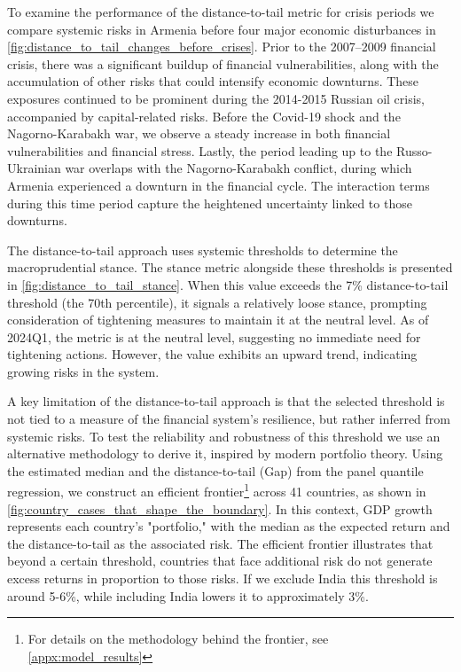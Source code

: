 To examine the performance of the distance-to-tail metric for crisis periods we compare systemic risks in Armenia before four major economic disturbances in \autoref{fig:distance_to_tail_changes_before_crises}. Prior to the 2007–2009 financial crisis, there was a significant buildup of financial vulnerabilities, along with the accumulation of other risks that could intensify economic downturns. These exposures continued to be prominent during the 2014-2015 Russian oil crisis, accompanied by capital-related risks. Before the Covid-19 shock and the Nagorno-Karabakh war, we observe a steady increase in both financial vulnerabilities and financial stress. Lastly, the period leading up to the Russo-Ukrainian war overlaps with the Nagorno-Karabakh conflict, during which Armenia experienced a downturn in the financial cycle. The interaction terms during this time period capture the heightened uncertainty linked to those downturns.

The distance-to-tail approach uses systemic thresholds to determine the macroprudential stance. The stance metric alongside these thresholds is presented in \autoref{fig:distance_to_tail_stance}. When this value exceeds the 7\% distance-to-tail threshold (the 70th percentile), it signals a relatively loose stance, prompting consideration of tightening measures to maintain it at the neutral level. As of 2024Q1, the metric is at the neutral level, suggesting no immediate need for tightening actions. However, the value exhibits an upward trend, indicating growing risks in the system.

A key limitation of the distance-to-tail approach is that the selected threshold is not tied to a measure of the financial system’s resilience, but rather inferred from systemic risks. To test the reliability and robustness of this threshold we use an alternative methodology to derive it, inspired by modern portfolio theory. Using the estimated median and the distance-to-tail (Gap) from the panel quantile regression, we construct an efficient frontier\footnote{For details on the methodology behind the frontier, see \ref{appx:model_results}} across 41 countries, as shown in \autoref{fig:country_cases_that_shape_the_boundary}. In this context, GDP growth represents each country’s "portfolio," with the median as the expected return and the distance-to-tail as the associated risk. The efficient frontier illustrates that beyond a certain threshold, countries that face additional risk do not generate excess returns in proportion to those risks. If we exclude India this threshold is around 5-6\%, while including India lowers it to approximately 3\%.


